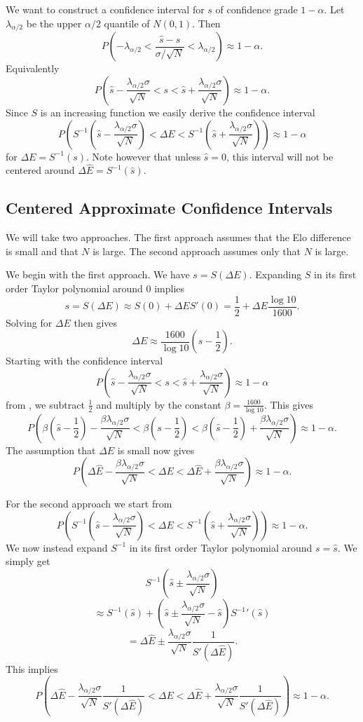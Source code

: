 \documentclass{article}
\theoremstyle{plain}
\theoremstyle{definition}
\begin{document}
We want to construct a confidence interval
for $s$ of confidence grade $1-\alpha$. Let $\lambda_{\alpha/2}$ be the upper $\alpha/2$
quantile of $N(0,1)$. Then $$P\left(-\lambda_{\alpha/2}<\frac{\hat s-s}{\sigma/\sqrt{N}}<
\lambda_{\alpha/2}\right)\approx1-\alpha.$$ Equivalently $$P\left(\hat s-
\frac{\lambda_{\alpha/2}\sigma}{\sqrt{N}}<s<\hat s+\frac{\lambda_{\alpha/2}\sigma}{\sqrt{N}}
\right)\approx1-\alpha.$$ Since $S$ is an increasing function we easily derive
the confidence interval
$$P\left(S^{-1}\left(\hat s-\frac{\lambda_{\alpha/2}\sigma}{\sqrt{N}}\right)<\Delta E<
S^{-1}\left(\hat s+\frac{\lambda_{\alpha/2}\sigma}{\sqrt{N}}\right)\right)\approx1-\alpha$$
for $\Delta E=S^{-1}(s)$. Note however that unless $\hat s=0$, this interval will not be
centered around $\Delta\hat E=S^{-1}(\hat s)$.

\subsection{Centered Approximate Confidence Intervals}
We will take two approaches. The first approach assumes that the Elo difference is small
and that $N$ is large. The second approach assumes only that $N$ is large.

We begin with the first approach. We have $s=S(\Delta E)$. Expanding $S$ in its first
order Taylor polynomial around $0$ implies $$s=S(\Delta E)\approx S(0)+\Delta ES'(0)=\frac12+
\Delta E\frac{\log10}{1600}.$$ Solving for $\Delta E$ then gives
$$\Delta E\approx\frac{1600}{\log10}\left(s-\frac12\right).$$
Starting with the confidence interval $$P\left(\hat s-\frac{\lambda_{\alpha/2}\sigma}{\sqrt{N}}
<s<\hat s+\frac{\lambda_{\alpha/2}\sigma}{\sqrt{N}}\right)\approx1-\alpha$$ from
, we subtract $\frac12$ and multiply by the constant
$\beta=\frac{1600}{\log10}$. This gives
$$P\left(\beta\left(\hat s-\frac12\right)-\frac{\beta\lambda_{\alpha/2}\sigma}
{\sqrt{N}}<\beta\left(s-\frac12\right)<\beta\left(\hat s-\frac12\right)+
\frac{\beta\lambda_{\alpha/2}\sigma}{\sqrt{N}}\right)\approx1-\alpha.$$
The assumption that $\Delta E$ is small now gives $$P\left(\Delta\hat E-
\frac{\beta\lambda_{\alpha/2}\sigma}{\sqrt{N}}<\Delta E<\Delta\hat E+
\frac{\beta\lambda_{\alpha/2}\sigma}{\sqrt{N}}\right)\approx1-\alpha.$$

For the second approach we start from
$$P\left(S^{-1}\left(\hat s-\frac{\lambda_{\alpha/2}\sigma}{\sqrt{N}}\right)<\Delta E<
S^{-1}\left(\hat s+\frac{\lambda_{\alpha/2}\sigma}{\sqrt{N}}\right)\right)\approx1-\alpha.$$
We now instead expand $S^{-1}$ in its first order Taylor polynomial around $s=\hat s$.
We simply get $$S^{-1}\left(\hat s\pm\frac{\lambda_{\alpha/2}
\sigma}{\sqrt{N}}\right)$$$$\approx S^{-1}\left(\hat s\right)+\left(\hat s\pm\frac{\lambda_{\alpha/2}
\sigma}{\sqrt{N}}-\hat s\right)S^{-1}{'}\left(\hat s\right)$$$$=
\Delta\hat E\pm\frac{\lambda_{\alpha/2}\sigma}{\sqrt{N}}\frac1{S'\left(\Delta\hat E\right)}.$$
This implies $$P\left(\Delta\hat E-\frac{\lambda_{\alpha/2}\sigma}{\sqrt{N}}
\frac1{S'\left(\Delta\hat E\right)}<\Delta E<\Delta\hat E+\frac{\lambda_{\alpha/2}\sigma}{\sqrt{N}}
\frac1{S'\left(\Delta\hat E\right)}\right)\approx1-\alpha.$$



\end{document}

